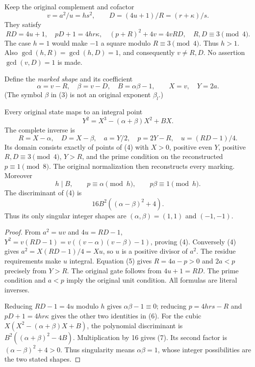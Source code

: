 Keep the original complement and cofactor
\[
 v=a^2/u=hs^2,\qquad D=(4u+1)/R=(r+\kappa)/s.
\]
They satisfy
\[
 RD=4u+1,\quad pD+1=4hr\kappa,\quad
 (p+R)^2+4v=4vRD,\quad R,D\equiv3\pmod4.                 \tag{2}
\]
The case $h=1$ would make $-1$ a square modulo $R\equiv3\pmod4$. Thus $h>1$.
Also $\gcd(h,R)=\gcd(h,D)=1$, and consequently $v\ne R,D$.
No assertion $\gcd(v,D)=1$ is made.

Define the \emph{marked shape} and its coefficient
\[
 \alpha=v-R,\quad \beta=v-D,\quad B=\alpha\beta-1,
 \qquad X=v,\quad Y=2a.                                  \tag{3}
\]
(The symbol $\beta$ in (3) is not an original exponent $\beta_l$.)
\begin{theorem}\label{thm:curve}
Every original state maps to an integral point
\[
 \boxed{Y^2=X^3-(\alpha+\beta)X^2+BX.}                    \tag{4}
\]
The complete inverse is
\[
 R=X-\alpha,\quad D=X-\beta,\quad a=Y/2,\quad
 p=2Y-R,\quad u=(RD-1)/4.                                \tag{5}
\]
Its domain consists exactly of points of (4) with $X>0$, positive even $Y$,
positive $R,D\equiv3\pmod4$, $Y>R$, and the prime condition on the reconstructed
$p\equiv1\pmod8$. The original normalization then reconstructs every marking.
Moreover
\[
 \boxed{h\mid B,\qquad p\equiv\alpha\pmod h,\qquad
 p\beta\equiv1\pmod h.}                                 \tag{6}
\]
The discriminant of (4) is
\[
 \boxed{16B^2((\alpha-\beta)^2+4).}                       \tag{7}
\]
Thus its only singular integer shapes are $(\alpha,\beta)=(1,1)$ and $(-1,-1)$.
\end{theorem}
\begin{proof}
From $a^2=uv$ and $4u=RD-1$,
$Y^2=v(RD-1)=v((v-\alpha)(v-\beta)-1)$, proving (4).
Conversely (4) gives $a^2=X(RD-1)/4=Xu$, so $u$ is a positive divisor of $a^2$.
The residue requirements make $u$ integral. Equation (5) gives $R=4a-p>0$ and
$2a<p$ precisely from $Y>R$. The original gate follows from $4u+1=RD$.
The prime condition and $a<p$ imply the original unit condition.
All formulas are literal inverses.

Reducing $RD-1=4u$ modulo $h$ gives $\alpha\beta-1\equiv0$; reducing
$p=4hrs-R$ and $pD+1=4hr\kappa$ gives the other two identities in (6).
For the cubic $X(X^2-(\alpha+\beta)X+B)$, the polynomial discriminant is
$B^2((\alpha+\beta)^2-4B)$. Multiplication by 16 gives (7).
Its second factor is $(\alpha-\beta)^2+4>0$. Thus singularity means
$\alpha\beta=1$, whose integer possibilities are the two stated shapes.
\end{proof}

